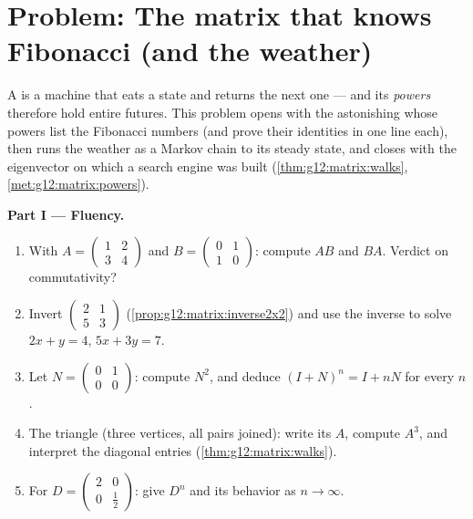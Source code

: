 \section{Problem: The matrix that knows Fibonacci (and the
weather)}

\begin{problem}
\label{pb:g12:matrix:1}
A  is a machine that eats a state and returns the next one
--- and its \emph{powers} therefore hold entire futures. This
problem opens with the astonishing  whose powers list the
Fibonacci numbers (and prove their identities in one line each),
then runs the weather as a Markov chain to its steady state, and
closes with the eigenvector on which a search engine was built
(\cref{thm:g12:matrix:walks},
\cref{met:g12:matrix:powers}).

\medskip
\noindent\textbf{Part I --- Fluency.}
\begin{enumerate}
  \item With $A = \begin{pmatrix} 1 & 2\\ 3 & 4\end{pmatrix}$
        and $B = \begin{pmatrix} 0 & 1\\ 1 & 0\end{pmatrix}$:
        compute $AB$ and $BA$. Verdict on commutativity?
  \item Invert $\begin{pmatrix} 2 & 1\\ 5 & 3\end{pmatrix}$
        (\cref{prop:g12:matrix:inverse2x2}) and use the inverse
        to solve $2x + y = 4$, $5x + 3y = 7$.
  \item Let $N = \begin{pmatrix} 0 & 1\\ 0 & 0\end{pmatrix}$:
        compute $N^2$, and deduce
        $(I + N)^n = I + nN$ for every $n$.
  \item The triangle  (three vertices, all pairs joined):
        write its  $A$, compute $A^3$, and
        interpret the diagonal entries
        (\cref{thm:g12:matrix:walks}).
  \item For $D = \begin{pmatrix} 2 & 0\\ 0 & \frac12
        \end{pmatrix}$: give $D^n$ and its behavior as
        $n \to \infty$.
\end{enumerate}


\end{problem}
